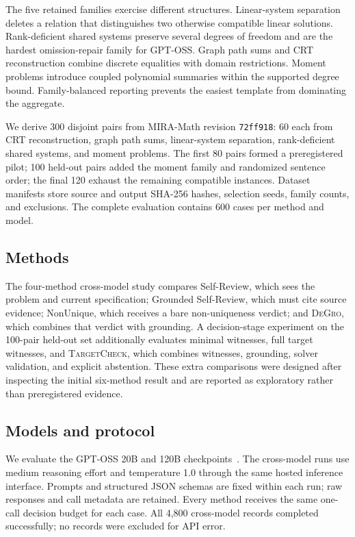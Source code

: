 \documentclass[sigconf,anonymous]{aamas}
\newcommand{\method}{\textsc{DeGro}}
\newcommand{\tc}{\textsc{TargetCheck}}
\begin{document}
The five retained families exercise different structures.  Linear-system separation deletes a relation that distinguishes two otherwise compatible linear solutions.  Rank-deficient shared systems preserve several degrees of freedom and are the hardest omission-repair family for GPT-OSS.  Graph path sums and CRT reconstruction combine discrete equalities with domain restrictions.  Moment problems introduce coupled polynomial summaries within the supported degree bound.  Family-balanced reporting prevents the easiest template from dominating the aggregate.

We derive 300 disjoint pairs from MIRA-Math revision \texttt{72ff918}: 60 each from CRT reconstruction, graph path sums, linear-system separation, rank-deficient shared systems, and moment problems.  The first 80 pairs formed a preregistered pilot; 100 held-out pairs added the moment family and randomized sentence order; the final 120 exhaust the remaining compatible instances.  Dataset manifests store source and output SHA-256 hashes, selection seeds, family counts, and exclusions.  The complete evaluation contains 600 cases per method and model.

\subsection{Methods}
The four-method cross-model study compares Self-Review, which sees the problem and current specification; Grounded Self-Review, which must cite source evidence; NonUnique, which receives a bare non-uniqueness verdict; and \method{}, which combines that verdict with grounding.  A decision-stage experiment on the 100-pair held-out set additionally evaluates minimal witnesses, full target witnesses, and \tc, which combines witnesses, grounding, solver validation, and explicit abstention.  These extra comparisons were designed after inspecting the initial six-method result and are reported as exploratory rather than preregistered evidence.

\subsection{Models and protocol}
We evaluate the GPT-OSS 20B and 120B checkpoints~\cite{openai2025gptoss}.  The cross-model runs use medium reasoning effort and temperature 1.0 through the same hosted inference interface.  Prompts and structured JSON schemas are fixed within each run; raw responses and call metadata are retained.  Every method receives the same one-call decision budget for each case.  All 4,800 cross-model records completed successfully; no records were excluded for API error.
\end{document}
